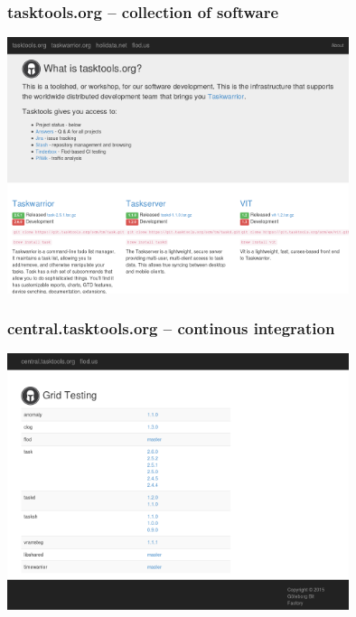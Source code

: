 \documentclass[t,handout]{beamer}
\begin{document}
\begin{frame}\frametitle{tasktools.org -- collection of software}
    \begin{center}
        \href{http://tasktools.org/}{\includegraphics[width=10cm,height=7.5cm]{tasktools-org.png}}
    \end{center}
\end{frame}

\begin{frame}\frametitle{central.tasktools.org -- continous integration}
    \begin{center}
        \href{http://central.tasktools.org/}{\includegraphics[width=10cm,height=7.5cm]{central-tasktools-org.png}}
    \end{center}
\end{frame}
\end{document}
